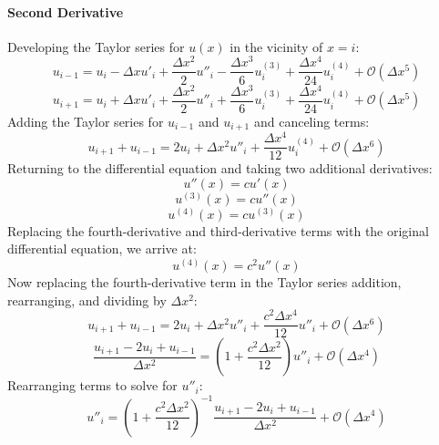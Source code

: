 \documentclass[10pt, reqno]{article}		%
\numberwithin{equation}{section}
\begin{document}
\paragraph{Second Derivative}
Developing the Taylor series for $u(x)$ in the vicinity of $x = i$:
\begin{equation}
u_{i-1} = u_i - \Delta x u'_i + \frac{\Delta x^2}{2} u''_i - \frac{\Delta x^3}{6} u^{(3)}_i + \frac{\Delta x^4}{24} u^{(4)}_i + \mathcal{O}(\Delta x^5)
\end{equation}
\begin{equation}
u_{i+1} = u_i + \Delta x u'_i + \frac{\Delta x^2}{2} u''_i + \frac{\Delta x^3}{6} u^{(3)}_i + \frac{\Delta x^4}{24} u^{(4)}_i + \mathcal{O}(\Delta x^5)
\end{equation}
Adding the Taylor series for $u_{i-1}$ and $u_{i+1}$ and canceling terms:
\begin{equation}
u_{i+1} + u_{i-1} = 2u_i + \Delta x^2 u''_i + \frac{\Delta x^4}{12} u^{(4)}_i + \mathcal{O}(\Delta x^6)
\end{equation}
Returning to the differential equation and taking two additional derivatives:
\begin{equation}
u''(x)=cu'(x)
\end{equation}
\begin{equation}
u^{(3)}(x)=cu''(x)
\end{equation}
\begin{equation}
u^{(4)}(x)=cu^{(3)}(x)
\end{equation}
Replacing the fourth-derivative and third-derivative terms with the original differential equation, we arrive at:
\begin{equation}
u^{(4)}(x) = c^2u''(x)
\end{equation}
Now replacing the fourth-derivative term in the Taylor series addition, rearranging, and dividing by $\Delta x^2$:
\begin{equation}
u_{i+1} + u_{i-1} = 2u_i + \Delta x^2 u''_i + \frac{c^2\Delta x^4}{12} u''_i + \mathcal{O}(\Delta x^6)
\end{equation}
\begin{equation}
\frac{u_{i+1} -2u_i + u_{i-1}}{\Delta x^2} =  \left(1 + \frac{c^2\Delta x^2}{12} \right)u''_i + \mathcal{O}(\Delta x^4)
\end{equation}
Rearranging terms to solve for $u''_i$:
\begin{equation}
u''_i = \left(1 + \frac{c^2\Delta x^2}{12} \right)^{-1} \frac{u_{i+1} -2u_i + u_{i-1}}{\Delta x^2} + \mathcal{O}(\Delta x^4)
\end{equation}
\end{document}
